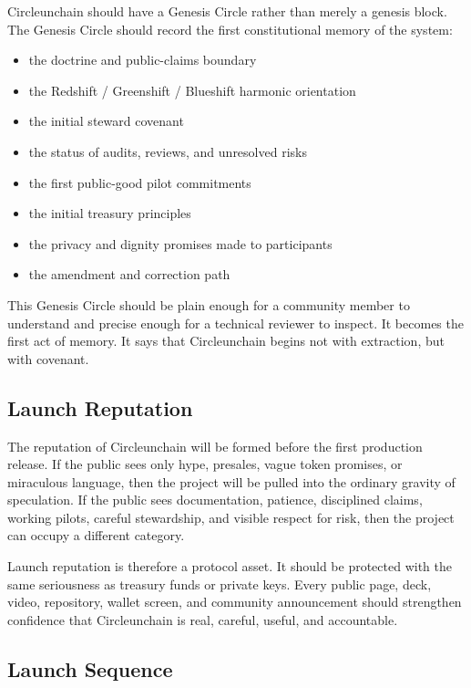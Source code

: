 \documentclass[12pt]{article}
\begin{document}
Circleunchain should have a Genesis Circle rather than merely a genesis block. The Genesis Circle should record the first constitutional memory of the system:

\begin{itemize}
  \item the doctrine and public-claims boundary
  \item the Redshift / Greenshift / Blueshift harmonic orientation
  \item the initial steward covenant
  \item the status of audits, reviews, and unresolved risks
  \item the first public-good pilot commitments
  \item the initial treasury principles
  \item the privacy and dignity promises made to participants
  \item the amendment and correction path
\end{itemize}

This Genesis Circle should be plain enough for a community member to understand and precise enough for a technical reviewer to inspect. It becomes the first act of memory. It says that Circleunchain begins not with extraction, but with covenant.

\subsection{Launch Reputation}

The reputation of Circleunchain will be formed before the first production release. If the public sees only hype, presales, vague token promises, or miraculous language, then the project will be pulled into the ordinary gravity of speculation. If the public sees documentation, patience, disciplined claims, working pilots, careful stewardship, and visible respect for risk, then the project can occupy a different category.

Launch reputation is therefore a protocol asset. It should be protected with the same seriousness as treasury funds or private keys. Every public page, deck, video, repository, wallet screen, and community announcement should strengthen confidence that Circleunchain is real, careful, useful, and accountable.

\subsection{Launch Sequence}
\end{document}

